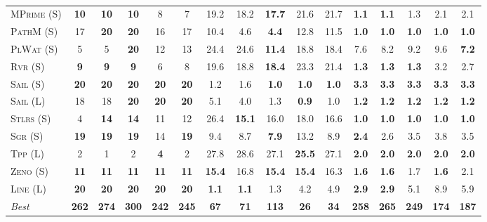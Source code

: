 \documentclass[11pt,landscape]{article}
\begin{document}
\begin{table*}[tb]
{\begin{tabular}{|l||ccccc||ccccc||ccccc||}
\textsc{MPrime} (S)&\textbf{10}&\textbf{10}&\textbf{10}&8&7&19.2&18.2&\textbf{17.7}&21.6&21.7&\textbf{1.1}&\textbf{1.1}&1.3&2.1&2.1\\
\textsc{PathM} (S)&17&\textbf{20}&\textbf{20}&16&17&10.4&4.6&\textbf{4.4}&12.8&11.5&\textbf{1.0}&\textbf{1.0}&\textbf{1.0}&\textbf{1.0}&\textbf{1.0}\\
\textsc{PlWat} (S)&5&5&\textbf{20}&12&13&24.4&24.6&\textbf{11.4}&18.8&18.4&7.6&8.2&9.2&9.6&\textbf{7.2}\\
\textsc{Rvr} (S)&\textbf{9}&\textbf{9}&\textbf{9}&6&8&19.6&18.8&\textbf{18.4}&23.3&21.4&\textbf{1.3}&\textbf{1.3}&\textbf{1.3}&3.2&2.7\\
\textsc{Sail} (S)&\textbf{20}&\textbf{20}&\textbf{20}&\textbf{20}&\textbf{20}&1.2&1.6&\textbf{1.0}&\textbf{1.0}&\textbf{1.0}&\textbf{3.3}&\textbf{3.3}&\textbf{3.3}&\textbf{3.3}&\textbf{3.3}\\
\textsc{Sail} (L)&18&18&\textbf{20}&\textbf{20}&\textbf{20}&5.1&4.0&1.3&\textbf{0.9}&1.0&\textbf{1.2}&\textbf{1.2}&\textbf{1.2}&\textbf{1.2}&\textbf{1.2}\\
\textsc{Stlrs} (S)&4&\textbf{14}&\textbf{14}&11&12&26.4&\textbf{15.1}&16.0&18.0&16.6&\textbf{1.0}&\textbf{1.0}&\textbf{1.0}&\textbf{1.0}&\textbf{1.0}\\
\textsc{Sgr} (S)&\textbf{19}&\textbf{19}&\textbf{19}&14&\textbf{19}&9.4&8.7&\textbf{7.9}&13.2&8.9&\textbf{2.4}&2.6&3.5&3.8&3.5\\
\textsc{Tpp} (L)&2&1&2&\textbf{4}&2&27.8&28.6&27.1&\textbf{25.5}&27.1&\textbf{2.0}&\textbf{2.0}&\textbf{2.0}&\textbf{2.0}&\textbf{2.0}\\
\textsc{Zeno} (S)&\textbf{11}&\textbf{11}&\textbf{11}&\textbf{11}&\textbf{11}&\textbf{15.4}&16.8&\textbf{15.4}&\textbf{15.4}&16.3&\textbf{1.6}&\textbf{1.6}&1.7&\textbf{1.6}&2.1\\
\textsc{Line} (L)&\textbf{20}&\textbf{20}&\textbf{20}&\textbf{20}&\textbf{20}&\textbf{1.1}&\textbf{1.1}&1.3&4.2&4.9&\textbf{2.9}&\textbf{2.9}&5.1&8.9&5.9
\\\hline
\textit{Best}&\textbf{262}&\textbf{274}&\textbf{300}&\textbf{242}&\textbf{245}&\textbf{67}&\textbf{71}&\textbf{113}&\textbf{26}&\textbf{34}&\textbf{258}&\textbf{265}&\textbf{249}&\textbf{174}&\textbf{187}\\\hline

        \end{tabular}}
        \caption{}
        \label{tab:all-patty}
        \end{table*}
        
\end{document}
